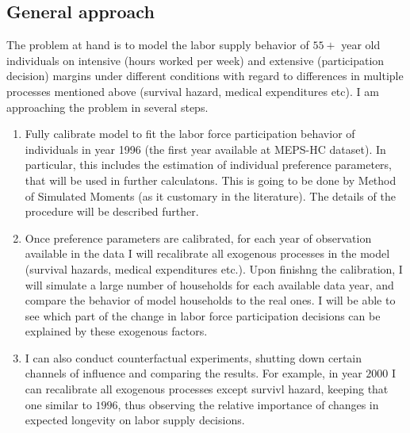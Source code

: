 \documentclass[
10pt, %
a4paper, %
oneside, %
headinclude,footinclude, %
BCOR5mm, %
]{scrartcl}
\begin{document}
\subsection{General approach}
The problem at hand is to model the labor supply behavior of $55+$ year old individuals on intensive (hours worked per week) and extensive (participation decision) margins under different conditions with regard to differences in multiple processes mentioned above (survival hazard, medical expenditures etc). I am approaching the problem in several steps.
\begin{enumerate}
\item Fully calibrate model to fit the labor force participation behavior of individuals in year 1996 (the first year available at MEPS-HC dataset). In particular, this includes the estimation of individual preference parameters, that will be used in further calculatons. This is going to be done by Method of Simulated Moments (as it customary in the literature). The details of the procedure will be described further.
\item Once preference parameters are calibrated, for each year of observation available in the data I will recalibrate all exogenous processes in the model (survival hazards, medical expenditures etc.). Upon finishng the calibration, I will simulate a large number of households for each available data year, and compare the behavior of model households to the real ones. I will be able to see which part of the change in labor force participation decisions can be explained by these exogenous factors.
\item I can also conduct counterfactual experiments, shutting down certain channels of influence and comparing the results. For example, in year $2000$ I can recalibrate all exogenous processes except survivl hazard, keeping that one similar to $1996$, thus observing the relative importance of changes in expected longevity on labor supply decisions. 
\end{enumerate}
\end{document}
